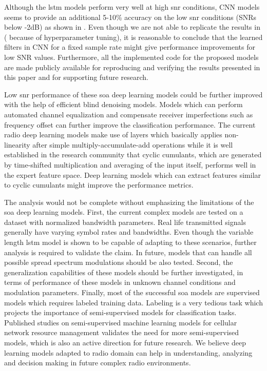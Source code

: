 Although the \ac{lstm} models perform very well at high \ac{snr} conditions, CNN models seems to provide an additional 5-10\% accuracy on the low \ac{snr} conditions (SNRs below -2dB) as shown in \cite{baseline}. Even though we are not able to replicate the results in \cite{baseline} (%
because of hyperparameter tuning), it is reasonable to conclude that the learned filters in CNN for a fixed sample rate might give performance improvements for low SNR values. Furthermore, all the implemented code for the proposed models are made publicly available for reproducing and verifying the results presented in this paper and for supporting future research.

Low \ac{snr} performance of these \ac{soa} deep learning models could be further improved with the help of efficient blind denoising models. Models which can perform automated channel equalization and compensate receiver imperfections such as frequency offset can further improve the classification performance. The current radio deep learning models make use of layers which basically applies non-linearity after simple multiply-accumulate-add operations while it is well established in the research community that cyclic cumulants, which are generated by time-shifted multiplication and averaging of the input itself, performs well in the expert feature space. Deep learning models which can extract features similar to cyclic cumulants might improve the performance metrics.

The analysis would not be complete without emphasizing the limitations of the \ac{soa} deep learning models. First, the current complex models are tested on a dataset with normalized bandwidth parameters. Real life transmitted signals generally have varying symbol rates and bandwidths. Even though the variable length \ac{lstm} model is shown to be capable of adapting to these scenarios, further analysis is required to validate the claim. %
In future, models that can handle all possible spread spectrum modulations should be also tested. Second, the generalization capabilities of these models should be further investigated, in terms of performance of these models in unknown channel conditions and modulation parameters. Finally, most of the successful \ac{soa} models are supervised models which requires labeled training data. Labeling is a very tedious task which projects the importance of semi-supervised models for classification tasks. Published studies \cite{mlresource} on semi-supervised machine learning models for cellular network resource management validates the need for more semi-supervised models, which is also an active direction for future research. We believe deep learning models adapted to radio domain can help in understanding, analyzing and decision making in future complex radio environments.